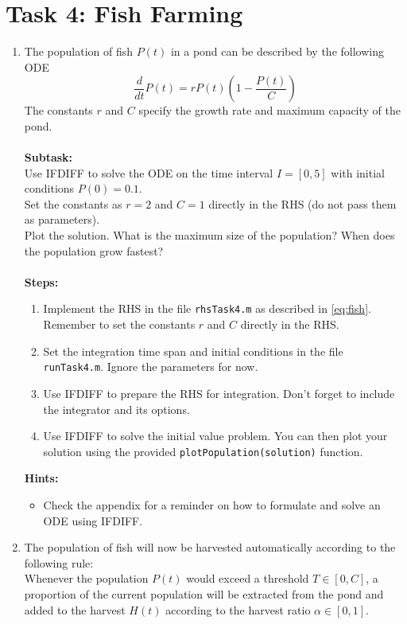 \section*{Task 4: Fish Farming}

\begin{enumerate}[label=\alph*)]
    \item\label{item:task4a} The population of fish $P(t)$ in a pond can be described by the following ODE
    \begin{equation}\label{eq:fish}
    \frac{d}{dt}P(t) = rP(t)\left(1 - \frac{P(t)}{C}\right)
    \end{equation}
    The constants $r$ and $C$ specify the growth rate and maximum capacity of the pond. \\\\
    \textbf{Subtask:} \\
    Use IFDIFF to solve the ODE on the time interval $I = [0, 5]$ with initial conditions $P(0) = 0.1$. \\
    Set the constants as $r = 2$ and $C = 1$ directly in the RHS (do not pass them as parameters). \\
    Plot the solution. What is the maximum size of the population? When does the population grow fastest? \\ \\
    \textbf{Steps:}
    \begin{enumerate}[label=\arabic*.]
        \item Implement the RHS in the file \texttt{rhsTask4.m} as described in \cref{eq:fish}. Remember to set the constants $r$ and $C$ directly in the RHS.
        \item Set the integration time span and initial conditions in the file \texttt{runTask4.m}. Ignore the parameters for now.
        \item Use IFDIFF to prepare the RHS for integration. Don't forget to include the integrator and its options.
        \item Use IFDIFF to solve the initial value problem. You can then plot your solution using the provided \lstinline!plotPopulation(solution)! function.
    \end{enumerate}
    \textbf{Hints:}
    \begin{itemize}
        \item Check the appendix for a reminder on how to formulate and solve an ODE using IFDIFF.
    \end{itemize}

    \item The population of fish will now be harvested automatically according to the following rule:\\
    Whenever the population $P(t)$ would exceed a threshold $T \in [0, C]$, a proportion of the current population will be extracted from the pond and added to the harvest $H(t)$ according to the harvest ratio $\alpha \in [0, 1]$.


\end{enumerate}
